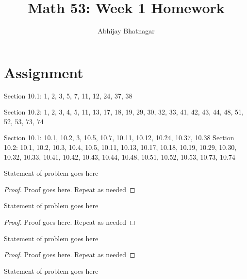\documentclass[12pt]{article}
\newenvironment{problem}[2][Problem]{\begin{trivlist}
\item[\hskip \labelsep {\bfseries #1}\hskip \labelsep {\bfseries #2.}]}{\end{trivlist}}
\begin{document}

\title{Math 53: Week 1 Homework}
\author{Abhijay Bhatnagar}
\maketitle

\setcounter{secnumdepth}{0} %
\section{Assignment}

Section 10.1: 1, 2, 3, 5, 7, 11, 12, 24, 37, 38

Section 10.2: 1, 2, 3, 4, 5, 11, 13, 17, 18, 19, 29, 30, 32, 33, 41, 42, 43, 44, 48, 51, 52, 53, 73, 74
\newline


Section 10.1: 10.1, 10.2, 3, 10.5, 10.7, 10.11, 10.12, 10.24, 10.37, 10.38
Section 10.2: 10.1, 10.2, 10.3, 10.4, 10.5, 10.11, 10.13, 10.17, 10.18, 10.19, 10.29, 10.30, 10.32, 10.33, 10.41, 10.42, 10.43, 10.44, 10.48, 10.51, 10.52, 10.53, 10.73, 10.74



\begin{problem}{10.1.1}
Statement of problem goes here
\end{problem}

\begin{proof}
Proof goes here. Repeat as needed
\end{proof}


\begin{problem}{x.yz}
Statement of problem goes here
\end{problem}

\begin{proof}
Proof goes here. Repeat as needed
\end{proof}


\begin{problem}{x.yz}
Statement of problem goes here
\end{problem}

\begin{proof}
Proof goes here. Repeat as needed
\end{proof}


\begin{problem}{x.yz}
Statement of problem goes here
\end{problem}
\end{document}

